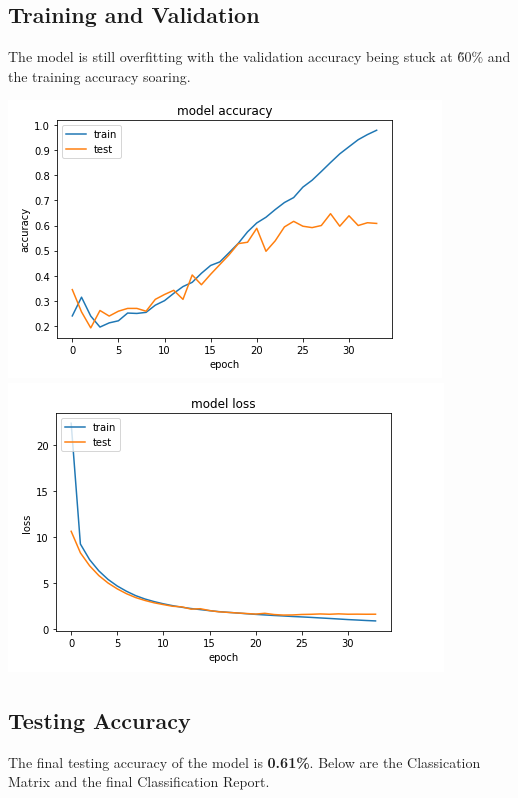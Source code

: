\documentclass{article}
\begin{document}
    \subsection{Training and Validation}

    The model is still overfitting with the validation accuracy being stuck at \~60\% and the training accuracy soaring.

    \begin{center}
        \includegraphics[scale=0.5]{acc}
        \includegraphics[scale=0.5]{loss}
    \end{center}

    \subsection{Testing Accuracy}

    The final testing accuracy of the model is \textbf{0.61\%}. Below are the Classication Matrix and the final
    Classification Report.
\end{document}

